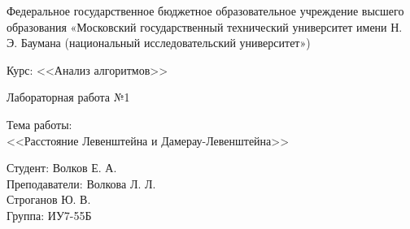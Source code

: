 \documentclass[a4paper,12pt]{article}
\begin{document}


\large
\begin{center}
Федеральное государственное бюджетное образовательное учреждение высшего образования «Московский государственный технический университет имени Н. Э. Баумана (национальный исследовательский университет»)
\end{center}

\vspace*{30mm} 

\LARGE
\begin{center}
Курс: <<Анализ алгоритмов>>

Лабораторная работа №1
\end{center}

\vspace*{30mm} 

\huge
\begin{center}
Тема работы:\\
<<Расстояние Левенштейна и Дамерау-Левенштейна>>
\end{center}
\vspace*{30mm} 

\large
\begin{flushright}
Студент: Волков Е. А. \\
Преподаватели: Волкова Л. Л. \\
				Строганов Ю. В. \\
Группа: ИУ7-55Б
\end{flushright}
\end{document}

